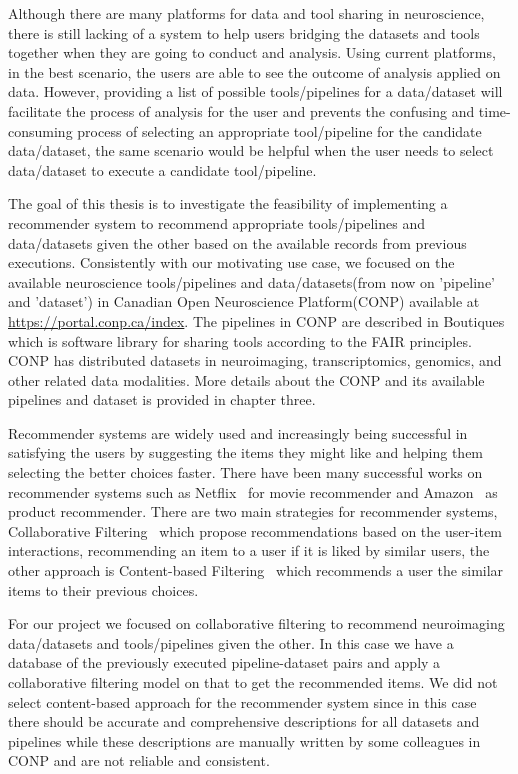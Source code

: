 Although there are many platforms for data and tool sharing in neuroscience, there is still lacking of a system to help users  bridging the datasets and tools together when they are going to conduct and analysis. Using current platforms, in the best scenario, the users are able to see the outcome of analysis applied on data. However, providing a list of possible tools/pipelines for a data/dataset will facilitate the process of analysis for the user and prevents the confusing and time-consuming process of selecting an appropriate tool/pipeline for the candidate data/dataset, the same scenario would be helpful when the user needs to select data/dataset to execute a candidate tool/pipeline.

The goal of this thesis is to investigate the feasibility of implementing a recommender system to recommend appropriate tools/pipelines and data/datasets given the other based on the available records from previous executions. Consistently with our motivating use case, we focused on the available neuroscience tools/pipelines and data/datasets(from now on 'pipeline' and 'dataset') in Canadian Open Neuroscience Platform(CONP) available at \url{https://portal.conp.ca/index}. The pipelines in CONP are described in Boutiques~\cite{glatard2018boutiques} which is software library for sharing tools according to the FAIR principles. CONP has distributed datasets in  neuroimaging, transcriptomics, genomics, and other related data modalities. More details about the CONP and its available pipelines and dataset is provided in chapter three.



Recommender systems are widely used and increasingly being successful in satisfying the users by suggesting the items they might like and helping them selecting the better choices faster. There have been many successful works on recommender systems such as Netflix~\cite{bennett2007netflix} for movie recommender and Amazon~\cite{7927889} as product recommender. There are two main strategies for recommender systems, Collaborative Filtering~\cite{rajaraman2011mining} which propose recommendations based on the user-item interactions, recommending an item to a user if it is liked by similar users, the other approach is Content-based Filtering~\cite{pazzani2007content} which recommends a user the similar items to their previous choices.  

For our project we focused on collaborative filtering to  recommend neuroimaging data/datasets and tools/pipelines given the other. In this case we have a database of the previously executed pipeline-dataset pairs and apply a collaborative filtering model on that to get the recommended items. We did not select content-based approach for the recommender system since in this case there should be accurate and comprehensive descriptions for all datasets and pipelines while these descriptions are manually written by some colleagues in CONP and are not reliable and consistent.   


